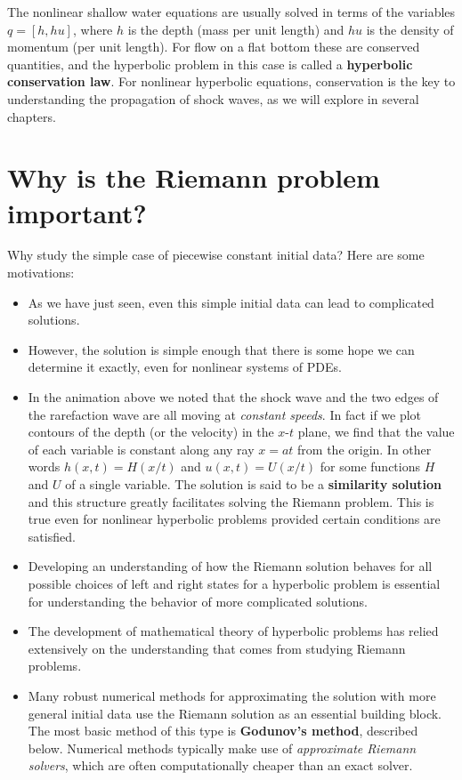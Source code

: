 \documentclass{SIAMbook2016}
\begin{document}
The nonlinear shallow water equations are usually solved in terms of the
variables \(q = [h, hu]\), where \(h\) is the depth (mass per unit
length) and \(hu\) is the density of momentum (per unit length). For
flow on a flat bottom these are conserved quantities, and the hyperbolic
problem in this case is called a \textbf{hyperbolic conservation law}.
For nonlinear hyperbolic equations, conservation is the key to
understanding the propagation of shock waves, as we will explore in
several chapters.

\hypertarget{why-is-the-riemann-problem-important}{%
\section{Why is the Riemann problem
important?}\label{why-is-the-riemann-problem-important}}

Why study the simple case of piecewise constant initial data? Here are
some motivations:

\begin{itemize}
\item
  As we have just seen, even this simple initial data can lead to
  complicated solutions.
\item
  However, the solution is simple enough that there is some hope we can
  determine it exactly, even for nonlinear systems of PDEs.
\item
  In the animation above we noted that the shock wave and the two edges
  of the rarefaction wave are all moving at \emph{constant speeds}. In
  fact if we plot contours of the depth (or the velocity) in the
  \(x\)-\(t\) plane, we find that the value of each variable is constant
  along any ray \(x = at\) from the origin. In other words
  \(h(x,t) = H(x/t)\) and \(u(x,t) = U(x/t)\) for some functions \(H\)
  and \(U\) of a single variable. The solution is said to be a
  \textbf{similarity solution} and this structure greatly facilitates
  solving the Riemann problem. This is true even for nonlinear
  hyperbolic problems provided certain conditions are satisfied.
\item
  Developing an understanding of how the Riemann solution behaves for
  all possible choices of left and right states for a hyperbolic problem
  is essential for understanding the behavior of more complicated
  solutions.
\item
  The development of mathematical theory of hyperbolic problems has
  relied extensively on the understanding that comes from studying
  Riemann problems.
\item
  Many robust numerical methods for approximating the solution with more
  general initial data use the Riemann solution as an essential building
  block. The most basic method of this type is \textbf{Godunov's
  method}, described below. Numerical methods typically make use of
  \emph{approximate Riemann solvers}, which are often computationally
  cheaper than an exact solver.
\end{itemize}
\end{document}
